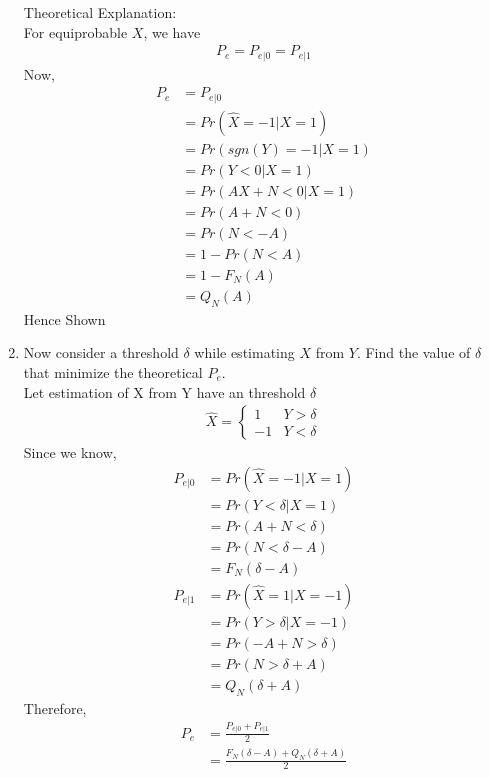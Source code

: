 \documentclass[journal,12pt,twocolumn]{IEEEtran}
\renewcommand\thesection{\arabic{section}}
\begin{document}
\begin{enumerate}[label=\thesection.\arabic*.,ref=\thesection.\theenumi]
\begin{figure}[H]
    \label{fig 5.7}
    \caption{}
\end{figure}
Theoretical Explanation:\\
For equiprobable $X$, we have
\begin{align}
    P_e = P_{e|0} = P_{e|1} \label{5.7.1}
\end{align}
Now,
\begin{align}
    P_e&=P_{e|0} \\
    &=Pr(\hat{X}=-1|X=1) \\
    &=Pr(sgn(Y)=-1|X=1) \\ 
    &= Pr(Y<0|X=1)\\
    &=Pr(AX+N<0|X=1) \\ 
    &= Pr(A+N < 0)\\
    &=Pr(N<-A) \\ 
    &= 1-Pr(N<A) \\
    &=1-F_N(A)\\
    &=Q_N(A) \label{5.7.11}
\end{align}
Hence Shown 
\item Now consider a threshold $\delta$ while estimating $X$ from $Y$. Find the value of $\delta$ that minimize the theoretical $P_e$.\\
\solution Let estimation of X from Y have an threshold $\delta$
\begin{align}
    \hat{X}=\begin{cases}
        1 & Y> \delta \\
        -1 & Y < \delta
    \end{cases}
\end{align}
Since we know,
\begin{align}
    P_{e|0} &= Pr(\hat{X}=-1|X=1)\\
    &=Pr(Y<\delta | X=1)\\
    &=Pr(A+N<\delta)\\
    &=Pr(N<\delta-A)\\
    &=F_N(\delta-A)\label{5.8.6}\\
    P_{e|1} &= Pr(\hat{X}=1|X=-1)\\
    &=Pr(Y>\delta | X=-1)\\
    &=Pr(-A+N>\delta)\\
    &=Pr(N>\delta+A)\\
    &=Q_N(\delta+A) \label{5.8.11}
\end{align}
Therefore,
\begin{align}
    P_e &=\frac{P_{e|0}+P_{e|1}}{2}\\
    &=\frac{F_N(\delta-A)+Q_N(\delta+A)}{2}

\end{align}
\end{enumerate}
\end{document}
